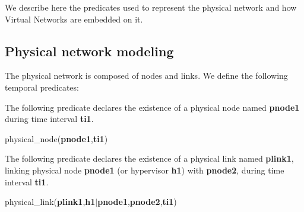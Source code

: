 \label{sec:model-network}
We describe here the predicates used to represent the physical network and how Virtual Networks are embedded on it.




\subsection{Physical network modeling}


The physical network is composed of nodes and links. We define the following temporal predicates:

The following predicate declares the existence of a physical node named
\textbf{pnode1} during time interval \textbf{ti1}.
\begin{myformula}
physical\_node(\textbf{pnode1},\textbf{ti1})
\end{myformula}

The following predicate declares the existence of a physical link named \textbf{plink1}, linking physical node \textbf{pnode1} (or hypervisor \textbf{h1}) with \textbf{pnode2}, during time interval \textbf{ti1}.
\begin{myformula}
physical\_link(\textbf{plink1},\textbf{h1}$\vert$\textbf{pnode1},\textbf{pnode2},\textbf{ti1})
\end{myformula}

